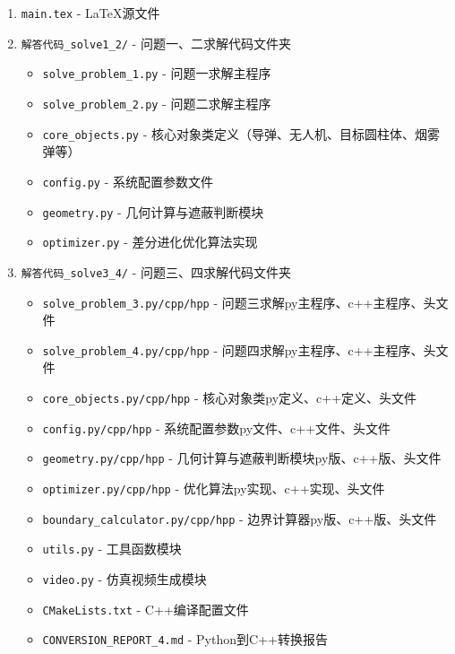 \documentclass[fontset=SimSun]{ctexart}
\begin{document}
\begin{enumerate}[leftmargin=2.5em]
    \item \texttt{main.tex} - LaTeX源文件
    \item \texttt{解答代码\_solve1\_2/} - 问题一、二求解代码文件夹
    \begin{itemize}[leftmargin=2.5em]
        \item \texttt{solve\_problem\_1.py} - 问题一求解主程序
        \item \texttt{solve\_problem\_2.py} - 问题二求解主程序
        \item \texttt{core\_objects.py} - 核心对象类定义（导弹、无人机、目标圆柱体、烟雾弹等）
        \item \texttt{config.py} - 系统配置参数文件
        \item \texttt{geometry.py} - 几何计算与遮蔽判断模块
        \item \texttt{optimizer.py} - 差分进化优化算法实现
    \end{itemize}
    \item \texttt{解答代码\_solve3\_4/} - 问题三、四求解代码文件夹
    \begin{itemize}[leftmargin=2.5em]
        \item \texttt{solve\_problem\_3.py/cpp/hpp} - 问题三求解py主程序、c++主程序、头文件
        \item \texttt{solve\_problem\_4.py/cpp/hpp} - 问题四求解py主程序、c++主程序、头文件
        \item \texttt{core\_objects.py/cpp/hpp} - 核心对象类py定义、c++定义、头文件
        \item \texttt{config.py/cpp/hpp} - 系统配置参数py文件、c++文件、头文件
        \item \texttt{geometry.py/cpp/hpp} - 几何计算与遮蔽判断模块py版、c++版、头文件
        \item \texttt{optimizer.py/cpp/hpp} - 优化算法py实现、c++实现、头文件
        \item \texttt{boundary\_calculator.py/cpp/hpp} - 边界计算器py版、c++版、头文件
        \item \texttt{utils.py} - 工具函数模块
        \item \texttt{video.py} - 仿真视频生成模块
        \item \texttt{CMakeLists.txt} - C++编译配置文件
        \item \texttt{CONVERSION\_REPORT\_4.md} - Python到C++转换报告
    \end{itemize}

\end{enumerate}
\end{document}
